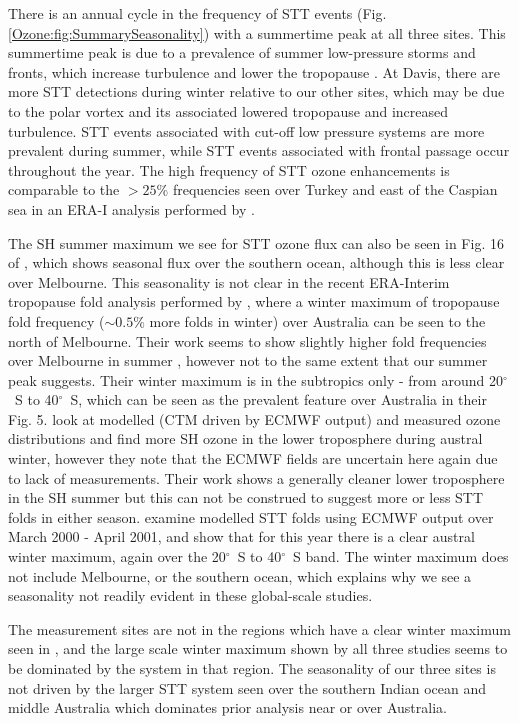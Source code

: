   There is an annual cycle in the frequency of STT events  (Fig. \ref{Ozone:fig:SummarySeasonality}) with a summertime peak at all three sites.
  This summertime peak is due to a prevalence of summer low-pressure storms and fronts, which increase turbulence and lower the tropopause \parencite{Reutter2015}.
  At Davis, there are more STT detections during winter relative to our other sites, which may be due to the polar vortex and its associated lowered tropopause and increased turbulence.
  STT events associated with cut-off low pressure systems are more prevalent during summer, while STT events associated with frontal passage occur throughout the year.
  The high frequency of STT ozone enhancements is comparable to the $>25\%$ frequencies seen over Turkey and east of the Caspian sea in an ERA-I analysis performed by \textcite{Tyrlis2014}. 
  
  The SH summer maximum we see for STT ozone flux can also be seen in Fig. 16 of \cite{Skerlak2014}, which shows seasonal flux over the southern ocean, although this is less clear over Melbourne.
  This seasonality is not clear in the recent ERA-Interim tropopause fold analysis performed by \textcite{Skerlak2015}, where a winter maximum of tropopause fold frequency ($\sim 0.5\%$ more folds in winter) over Australia can be seen to the north of Melbourne.
  Their work seems to show slightly higher fold frequencies over Melbourne in summer \parencite[][Fig. 5]{Skerlak2015}, however not to the same extent that our summer peak suggests.
  Their winter maximum is in the subtropics only - from around 20$^{\circ}$~S to 40$^{\circ}$~S, which can be seen as the prevalent feature over Australia in their Fig. 5.
  \cite{Wauben1998} look at modelled (CTM driven by ECMWF output) and measured ozone distributions and find more SH ozone in the lower troposphere during austral winter, however they note that the ECMWF fields are uncertain here again due to lack of measurements.
  Their work shows a generally cleaner lower troposphere in the SH summer but this can not be construed to suggest more or less STT folds in either season.
  \cite{Sprenger2003} examine modelled STT folds using ECMWF output over March 2000 - April 2001, and show that for this year there is a clear austral winter maximum, again over the 20$^{\circ}$~S to 40$^{\circ}$~S band.
  The winter maximum does not include Melbourne, or the southern ocean, which explains why we see a seasonality not readily evident in these global-scale studies.
  
  The measurement sites are not in the regions which have a clear winter maximum seen in \cite[Fig. 1][]{Sprenger2003}, and the large scale winter maximum shown by all three studies seems to be dominated by the system in that region.
  The seasonality of our three sites is not driven by the larger STT system seen over the southern Indian ocean and middle Australia which dominates prior analysis near or over Australia.
  
